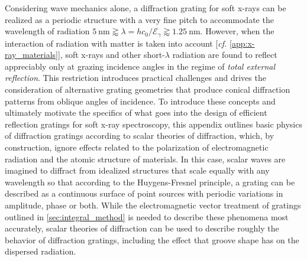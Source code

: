 Considering wave mechanics alone, a diffraction grating for soft x-rays can be realized as a periodic structure with a very fine pitch to accommodate the wavelength of radiation $\SI{5}{\nm} \gtrapprox \lambda = h c_0 / \mathcal{E}_{\gamma} \gtrapprox \SI{1.25}{\nm}$. 
However, when the interaction of radiation with matter is taken into account [\emph{cf.\@} \cref{app:x-ray_materials}], soft x-rays and other short-$\lambda$ radiation are found to reflect appreciably only at grazing incidence angles in the regime of \emph{total external reflection}. 
This restriction introduces practical challenges and drives the consideration of alternative grating geometries that produce conical diffraction patterns from oblique angles of incidence. 
To introduce these concepts and ultimately motivate the specifics of what goes into the design of efficient reflection gratings for soft x-ray spectroscopy, this appendix outlines basic physics of diffraction gratings according to scalar theories of diffraction, which, by construction, ignore effects related to the polarization of electromagnetic radiation and the atomic structure of materials. 
In this case, scalar waves are imagined to diffract from idealized structures that scale equally with any wavelength so that according to the Huygens-Fresnel principle, a grating can be described as a continuous surface of point sources with periodic variations in amplitude, phase or both. 
While the electromagnetic vector treatment of gratings outlined in \cref{sec:integral_method} is needed to describe these phenomena most accurately, scalar theories of diffraction can be used to describe roughly the behavior of diffraction gratings, including the effect that groove shape has on the dispersed radiation. 

